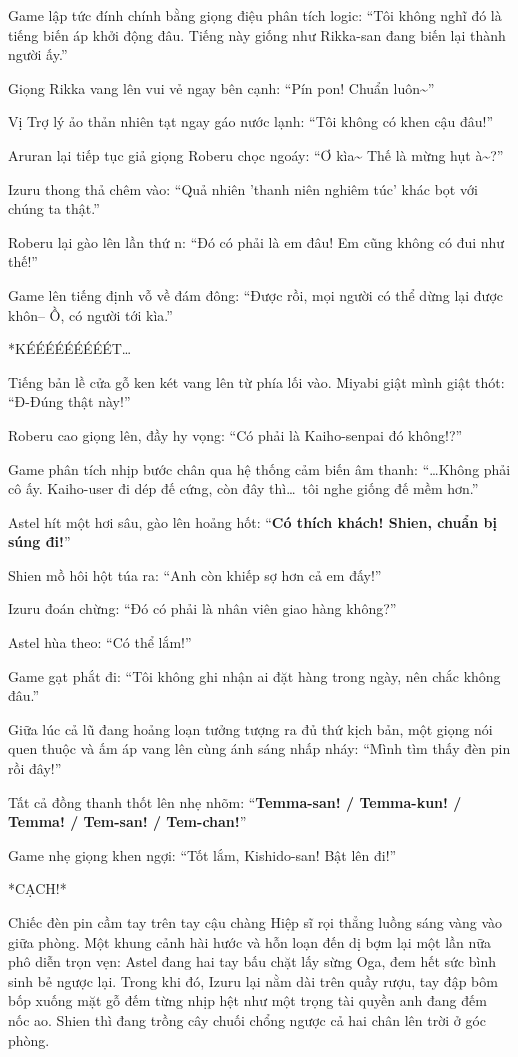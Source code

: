\documentclass[../main.tex]{subfiles}
\begin{document}
Game lập tức đính chính bằng giọng điệu phân tích logic: ``Tôi không nghĩ đó là tiếng biến áp khởi động đâu. Tiếng này giống như Rikka-san đang biến lại thành người ấy.''

Giọng Rikka vang lên vui vẻ ngay bên cạnh: ``Pín pon! Chuẩn luôn\~{}''

Vị Trợ lý ảo thản nhiên tạt ngay gáo nước lạnh: ``Tôi không có khen cậu đâu!''

Aruran lại tiếp tục giả giọng Roberu chọc ngoáy: ``Ơ kìa\~{} Thế là mừng hụt à\~{}?''

Izuru thong thả chêm vào: ``Quả nhiên 'thanh niên nghiêm túc' khác bọt với chúng ta thật.''

Roberu lại gào lên lần thứ n: ``Đó có phải là em đâu! Em cũng không có đui như thế!''

Game lên tiếng định vỗ về đám đông: ``Được rồi, mọi người có thể dừng lại được khôn-- Ồ, có người tới kìa.''

*KÉÉÉÉÉÉÉÉÉT\dots*

Tiếng bản lề cửa gỗ ken két vang lên từ phía lối vào. Miyabi giật mình giật thót: ``Đ-Đúng thật này!''

Roberu cao giọng lên, đầy hy vọng: ``Có phải là Kaiho-senpai đó không!?''

Game phân tích nhịp bước chân qua hệ thống cảm biến âm thanh: ``\dots Không phải cô ấy. Kaiho-user đi dép đế cứng, còn đây thì\dots\ tôi nghe giống đế mềm hơn.''

Astel hít một hơi sâu, gào lên hoảng hốt: ``\textbf{Có thích khách! Shien, chuẩn bị súng đi!}''

Shien mồ hôi hột túa ra: ``Anh còn khiếp sợ hơn cả em đấy!''

Izuru đoán chừng: ``Đó có phải là nhân viên giao hàng không?''

Astel hùa theo: ``Có thể lắm!''

Game gạt phắt đi: ``Tôi không ghi nhận ai đặt hàng trong ngày, nên chắc không đâu.''

Giữa lúc cả lũ đang hoảng loạn tưởng tượng ra đủ thứ kịch bản, một giọng nói quen thuộc và ấm áp vang lên cùng ánh sáng nhấp nháy: ``Mình tìm thấy đèn pin rồi đây!''

Tất cả đồng thanh thốt lên nhẹ nhõm: ``\textbf{Temma-san! / Temma-kun! / Temma! / Tem-san! / Tem-chan!}''

Game nhẹ giọng khen ngợi: ``Tốt lắm, Kishido-san! Bật lên đi!''

*CẠCH!*

Chiếc đèn pin cầm tay trên tay cậu chàng Hiệp sĩ rọi thẳng luồng sáng vàng vào giữa phòng. Một khung cảnh hài hước và hỗn loạn đến dị bợm lại một lần nữa phô diễn trọn vẹn: Astel đang hai tay bấu chặt lấy sừng Oga, đem hết sức bình sinh bẻ ngược lại. Trong khi đó, Izuru lại nằm dài trên quầy rượu, tay đập bôm bốp xuống mặt gỗ đếm từng nhịp hệt như một trọng tài quyền anh đang đếm nốc ao. Shien thì đang trồng cây chuối chổng ngược cả hai chân lên trời ở góc phòng.
\end{document}
